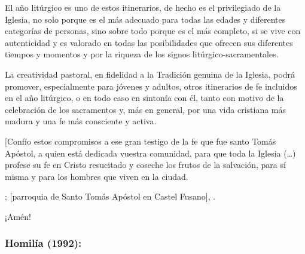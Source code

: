 \begin{body}
				El año litúrgico es uno de estos itinerarios, de hecho es el privilegiado de la Iglesia, no solo porque es el más adecuado para todas las edades y diferentes categorías de personas, sino sobre todo porque es el más completo, si se vive con autenticidad y es valorado en todas las posibilidades que ofrecen sus diferentes tiempos y momentos y por la riqueza de los signos litúrgico-sacramentales. 
				
				La creatividad pastoral, en fidelidad a la Tradición genuina de la Iglesia, podrá promover, especialmente para jóvenes y adultos, otros itinerarios de fe incluidos en el año litúrgico, o en todo caso en sintonía con él, tanto con motivo de la celebración de los sacramentos y, más en general, por una vida cristiana más madura y una fe más consciente y activa. 
				
				{[}Confío estos compromisos a ese gran testigo de la fe que fue santo Tomás Apóstol, a quien está dedicada vuestra comunidad, para que toda la Iglesia (\ldots{}) profese su fe en Cristo resucitado y coseche los frutos de la salvación, para sí misma y para los hombres que viven en la ciudad. 
				
				; {[}parroquia de Santo Tomás Apóstol en Castel Fusano{]}, . 
				
				¡Amén!
			\end{body}
		
			\subsubsection{Homilía (1992):}
			
				
